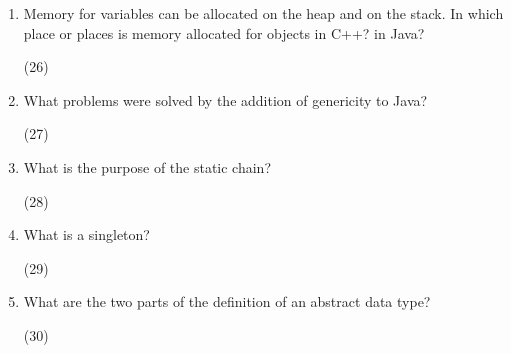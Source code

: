 \begin{enumerate}

  \item Memory for variables can be allocated on the heap
    and on the stack. In which place or places is memory
    allocated for objects in C++? in Java?

   \begin{answer}
    (26)
    \end{answer}

  \item What problems were solved by the addition
    of genericity to Java?

   \begin{answer}
    (27)
    \end{answer}

  \item What is the purpose of the static chain?

    \begin{answer}
    (28)
    \end{answer}
  \item What is a singleton?

    \begin{answer}
    (29)
    \end{answer}

  \item What are the two parts of the definition 
    of an abstract data type?

   \begin{answer}
    (30)
    \end{answer}

  \end{enumerate}



